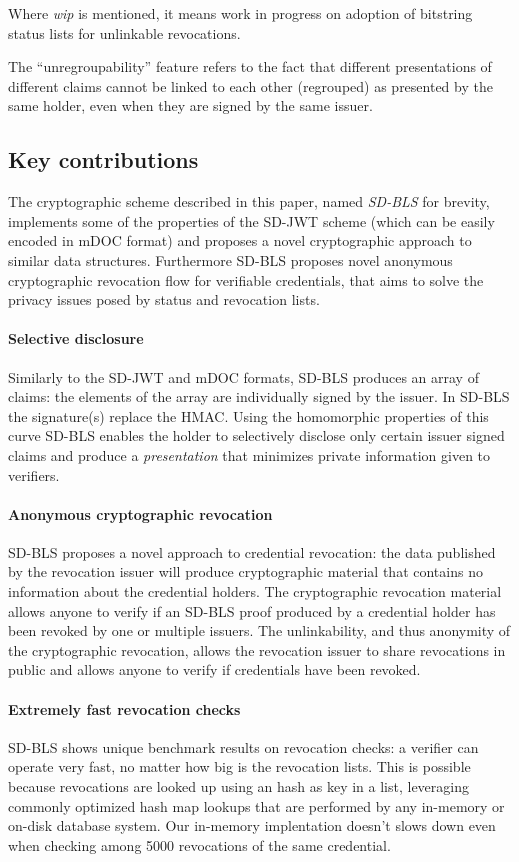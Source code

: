 Where \emph{wip} is mentioned, it means work in progress on adoption of
bitstring status lists for unlinkable revocations.

The ``unregroupability'' feature refers to the fact that different
presentations of different claims cannot be linked to each other
(regrouped) as presented by the same holder, even when they are signed
by the same issuer.

\subsection{Key contributions}
The cryptographic scheme described in this paper, named
\textit{SD-BLS} for brevity, implements some of the properties of the
SD-JWT scheme (which can be easily encoded in mDOC format) and
proposes a novel cryptographic approach to similar data
structures. Furthermore SD-BLS proposes novel anonymous cryptographic
revocation flow for verifiable credentials, that aims to solve the
privacy issues posed by status and revocation lists.

\paragraph{Selective disclosure}
Similarly to the SD-JWT and mDOC formats, SD-BLS produces an array of
claims: the elements of the array are individually signed by the
issuer. In SD-BLS the signature(s) replace the HMAC. Using the
homomorphic properties of this curve SD-BLS enables the holder to
selectively disclose only certain issuer signed claims and produce a
\textit{presentation} that minimizes private information given to
verifiers.

\paragraph{Anonymous cryptographic revocation}
SD-BLS proposes a novel approach to credential revocation: the data
published by the revocation issuer will produce cryptographic material
that contains no information about the credential holders. The
cryptographic revocation material allows anyone to verify if an SD-BLS
proof produced by a credential holder has been revoked by one or
multiple issuers. The unlinkability, and thus anonymity of the
cryptographic revocation, allows the revocation issuer to share
revocations in public and allows anyone to verify if credentials have
been revoked.

\paragraph{Extremely fast revocation checks}
SD-BLS shows unique benchmark results on revocation checks: a verifier
can operate very fast, no matter how big is the revocation lists. This
is possible because revocations are looked up using an hash as key in
a list, leveraging commonly optimized hash map lookups that are
performed by any in-memory or on-disk database system. Our in-memory
implentation doesn't slows down even when checking among 5000
revocations of the same credential.

